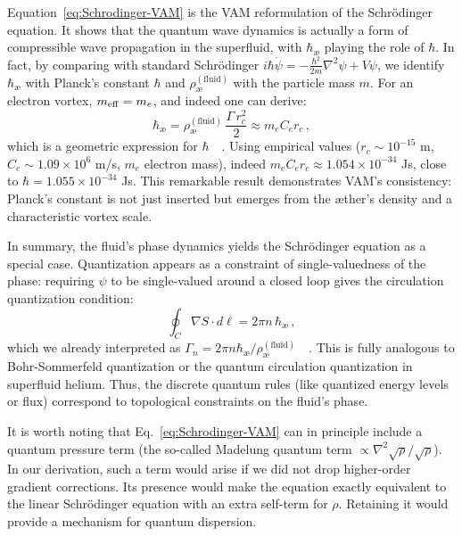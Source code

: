 \documentclass[preprint]{revtex4-2}
\begin{document}
    Equation~\eqref{eq:Schrodinger-VAM} is the VAM reformulation of the Schrödinger equation. It shows that the quantum wave dynamics is actually a form of compressible wave propagation in the superfluid, with $\hbar_{\text{\ae}}$ playing the role of $\hbar$. In fact, by comparing with standard Schrödinger $i\hbar \dot{\psi} = -\frac{\hbar^2}{2m}\nabla^2\psi + V \psi$, we identify $\hbar_{\text{\ae}}$ with Planck’s constant $\hbar$ and $\rho_{\text{\ae}}^{(\text{fluid})}$ with the particle mass $m$. For an electron vortex, $m_{\rm eff} = m_e$, and indeed one can derive:
    \begin{equation}
        \hbar_{\text{\ae}} = \rho_{\text{\ae}}^{(\text{fluid})}\,\frac{\Gamma\, r_c^2}{2} \approx m_e C_e r_c\,,
        \label{eq:hbar-geom}
    \end{equation}
    which is a geometric expression for $\hbar$~\cite{reference_72}~\cite{reference_73}. Using empirical values ($r_c \sim 10^{-15}$ m, $C_e \sim 1.09\times 10^6$ m/s, $m_e$ electron mass), indeed $m_e C_e r_c \approx 1.054\times 10^{-34}$ Js, close to $\hbar = 1.055\times 10^{-34}$ Js. This remarkable result demonstrates VAM’s consistency: Planck’s constant is not just inserted but emerges from the æther’s density and a characteristic vortex scale.

    In summary, the fluid’s phase dynamics yields the Schrödinger equation as a special case. Quantization appears as a constraint of single-valuedness of the phase: requiring $\psi$ to be single-valued around a closed loop gives the circulation quantization condition:
    \begin{equation}
        \oint_C \nabla S \cdot d\ell = 2\pi n\,\hbar_{\text{\ae}}\,,
    \end{equation}
    which we already interpreted as $\Gamma_n = 2\pi n \hbar_{\text{\ae}}/\rho_{\text{\ae}}^{(\text{fluid})}$~\cite{reference_74}~\cite{reference_75}. This is fully analogous to Bohr-Sommerfeld quantization or the quantum circulation quantization in superfluid helium. Thus, the discrete quantum rules (like quantized energy levels or flux) correspond to topological constraints on the fluid’s phase.

    It is worth noting that Eq.~\eqref{eq:Schrodinger-VAM} can in principle include a quantum pressure term (the so-called Madelung quantum term $\propto \nabla^2\sqrt{\rho}/\sqrt{\rho}$). In our derivation, such a term would arise if we did not drop higher-order gradient corrections. Its presence would make the equation exactly equivalent to the linear Schrödinger equation with an extra self-term for $\rho$. Retaining it would provide a mechanism for quantum dispersion.
\end{document}
